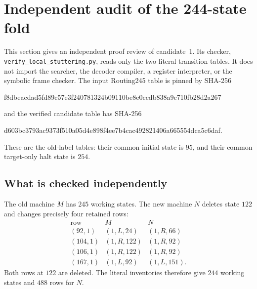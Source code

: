 \section{Independent audit of the 244-state fold}
\label{sec:independent-local-audit}

This section gives an independent proof review of candidate~1.  Its checker,
\texttt{verify\_local\_stuttering.py}, reads only the two literal transition
tables.  It does not import the searcher, the decoder compiler, a register
interpreter, or the symbolic frame checker.  The input Routing245 table is
pinned by SHA-256
\begin{center}\small\ttfamily
f8dbeacdad5fd89c57e3f240781324b09110be8e0ccdb838a9c710fb28d2a267
\end{center}
and the verified candidate table has SHA-256
\begin{center}\small\ttfamily
d603bc3793ac9373f510a05d4e898f4ee7b4cac492821406a665554dca5c6daf.
\end{center}
These are the old-label tables: their common initial state is $95$, and
their common target-only halt state is $254$.

\subsection{What is checked independently}

The old machine $M$ has $245$ working states.  The new machine $N$ deletes
state $122$ and changes precisely four retained rows:
\[
\begin{array}{c|c|c}
\text{row}&M&N\\ \hline
(92,1)&(1,L,24)&(1,R,66)\\
(104,1)&(1,R,122)&(1,R,92)\\
(106,1)&(1,R,122)&(1,R,92)\\
(167,1)&(1,L,92)&(1,L,151).
\end{array}
\]
Both rows at $122$ are deleted.  The literal inventories therefore give
$244$ working states and $488$ rows for $N$.

